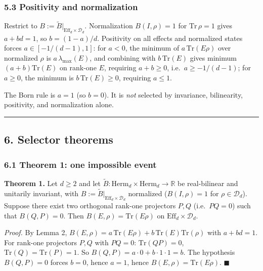 \documentclass[
]{article}
\begin{document}
\subsubsection{5.3 Positivity and
normalization}\label{positivity-and-normalization}

Restrict to \(B:=\widetilde B|_{\mathrm{Eff}_d\times\mathcal D_d}\).
Normalization \(B(I,\rho)=1\) for \(\mathrm{Tr}\,\rho=1\) gives
\(a+bd=1\), so \(b=(1-a)/d\). Positivity on all effects and normalized
states forces \(a\in[-1/(d-1),1]\): for \(a<0\), the minimum of
\(a\,\mathrm{Tr}(E\rho)\) over normalized \(\rho\) is
\(a\,\lambda_{\max}(E)\), and combining with \(b\,\mathrm{Tr}(E)\) gives
minimum \((a+b)\mathrm{Tr}(E)\) on rank-one \(E\), requiring
\(a+b\geq 0\), i.e.~\(a\geq -1/(d-1)\); for \(a\geq 0\), the minimum is
\(b\,\mathrm{Tr}(E)\geq 0\), requiring \(a\leq 1\).

The Born rule is \(a=1\) (so \(b=0\)). It is \emph{not} selected by
invariance, bilinearity, positivity, and normalization alone.

\begin{center}\rule{0.5\linewidth}{0.5pt}\end{center}

\subsection{6. Selector theorems}\label{selector-theorems}

\subsubsection{6.1 Theorem 1: one impossible
event}\label{theorem-1-one-impossible-event}

\textbf{Theorem 1.} Let \(d\geq 2\) and let
\(\widetilde B:\mathrm{Herm}_d\times\mathrm{Herm}_d\to\mathbb R\) be
real-bilinear and unitarily invariant, with
\(B:=\widetilde B|_{\mathrm{Eff}_d\times\mathcal D_d}\) normalized
(\(B(I,\rho)=1\) for \(\rho\in\mathcal D_d\)). Suppose there exist two
orthogonal rank-one projectors \(P,Q\) (i.e.~\(PQ=0\)) such that
\(B(Q,P)=0\). Then \(B(E,\rho)=\mathrm{Tr}(E\rho)\) on
\(\mathrm{Eff}_d\times\mathcal D_d\).

\emph{Proof.} By Lemma 2,
\(B(E,\rho)=a\,\mathrm{Tr}(E\rho)+b\,\mathrm{Tr}(E)\mathrm{Tr}(\rho)\)
with \(a+bd=1\). For rank-one projectors \(P,Q\) with \(PQ=0\):
\(\mathrm{Tr}(QP)=0\), \(\mathrm{Tr}(Q)=\mathrm{Tr}(P)=1\). So
\(B(Q,P)=a\cdot 0+b\cdot 1\cdot 1=b\). The hypothesis \(B(Q,P)=0\)
forces \(b=0\), hence \(a=1\), hence \(B(E,\rho)=\mathrm{Tr}(E\rho)\).
\(\blacksquare\)
\end{document}

